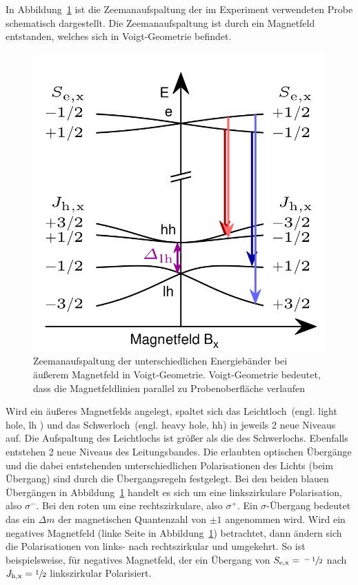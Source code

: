 In Abbildung~\ref{fig:zeeman} ist die Zeemanaufspaltung der im Experiment verwendeten Probe schematisch dargestellt.
Die Zeemanaufspaltung ist durch ein Magnetfeld entstanden, welches sich in Voigt-Geometrie befindet.
\begin{figure}
    \centering
    \includegraphics[scale=0.25]{./Plots/zeeman.png}
    \caption{Zeemanaufspaltung der unterschiedlichen Energiebänder bei äußerem Magnetfeld in Voigt-Geometrie.\cite{felix}
    Voigt-Geometrie bedeutet, dass die Magnetfeldlinien parallel zu Probenoberfläche verlaufen}
    \label{fig:zeeman}
\end{figure}
\FloatBarrier

Wird ein äußeres Magnetfelds angelegt, spaltet sich das Leichtloch~(engl. light hole, lh ) 
und das Schwerloch~(engl. heavy hole, hh) in jeweils 2 neue Niveaus auf.
Die Aufspaltung des Leichtlochs ist größer als die des Schwerlochs.
Ebenfalls entstehen 2 neue Niveaus des Leitungsbandes.
Die erlaubten optischen Übergänge und die dabei entstehenden unterschiedlichen 
Polarisationen des Lichts (beim Übergang) sind durch die Übergangsregeln festgelegt.
Bei den beiden blauen Übergängen in Abbildung~\ref{fig:zeeman} handelt
es sich um eine linkszirkulare Polarisation, also $\sigma^-$.
Bei den roten um eine rechtszirkulare, also  $\sigma^+$. 
Ein $\sigma$-Übergang bedeutet das ein $\Delta m$ der magnetischen Quantenzahl von 
$\pm 1$ angenommen wird.
Wird ein negatives Magnetfeld (linke Seite in Abbildung~\ref{fig:zeeman}) betrachtet,
dann ändern sich die Polarisationen von links- nach rechtszirkular und umgekehrt.
So ist beispielsweise, für negatives Magnetfeld, der ein Übergang von $S_\text{e,x} = \sfrac{-1}{2}$
nach $J_\text{h,x} = \sfrac{1}{2}$ linkszirkular Polarisiert.

